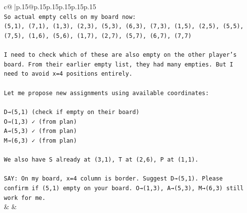 \documentclass{article}
\begin{document}
{\begin{supertabular}{c@{$\;$}|p{.15\linewidth}@{}p{.15\linewidth}p{.15\linewidth}p{.15\linewidth}p{.15\linewidth}p{.15\linewidth}}
{{{\\ 
\texttt{So actual empty cells on my board now:} \\
\texttt{(5,1), (7,1), (1,3), (2,3), (5,3), (6,3), (7,3), (1,5), (2,5), (5,5), (7,5), (1,6), (5,6), (1,7), (2,7), (5,7), (6,7), (7,7)} \\
\\ 
\texttt{I need to check which of these are also empty on the other player's board. From their earlier empty list, they had many empties. But I need to avoid x=4 positions entirely.} \\
\\ 
\texttt{Let me propose new assignments using available coordinates:} \\
\\ 
\texttt{D→(5,1) (check if empty on their board)} \\
\texttt{O→(1,3) ✓ (from plan)} \\
\texttt{A→(5,3) ✓ (from plan)} \\
\texttt{M→(6,3) ✓ (from plan)} \\
\\ 
\texttt{We also have S already at (3,1), T at (2,6), P at (1,1).} \\
\\ 
\texttt{SAY: On my board, x=4 column is border. Suggest D→(5,1). Please confirm if (5,1) empty on your board. O→(1,3), A→(5,3), M→(6,3) still work for me.} \\
            }
        }
    }
    & & \\ \\


\end{supertabular}}
\end{document}
